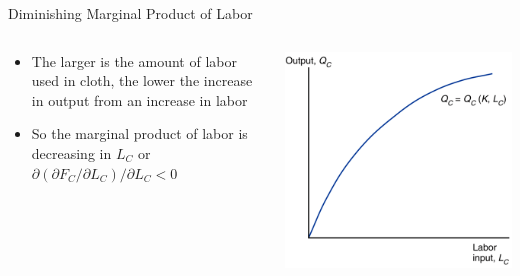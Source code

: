 \documentclass[10pt,hyperref={CJKbookmarks=true},xcolor=dvipsnames,aspectratio=169]{beamer}
\begin{document}
\begin{frame}{Diminishing Marginal Product of Labor }


\begin{columns}[onlytextwidth]
\begin{column}{0.4\textwidth}
\begin{itemize}
\item The larger is the amount of labor used in cloth, the lower the increase
in output from an increase in labor
\item So the marginal product of labor is decreasing in $L_{C}$ or $\partial(\partial F_{C}/\partial L_{C})/\partial L_{C}<0$
\end{itemize}

\end{column}
\begin{column}{0.6\textwidth}
\centering \includegraphics[width=0.7\columnwidth]{fig/sfm/lec4-5}
\end{column}
\end{columns}

\end{frame}
\end{document}
